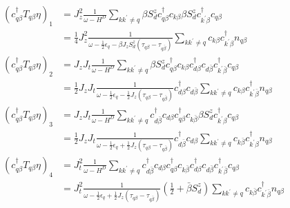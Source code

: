 \documentclass[14pt]{extarticle}
\numberwithin{equation}{section}
\begin{document}
\begin{subequations} \label{eq:31} 
 \begin{align}
\left( c^{\dag}_{q\beta}T_{q\beta}\eta \right)_1  &= J_z^2 \frac{1}{\omega - H^D} \sum\limits_{kk^{\prime}\ne q} \beta S_d^z c^{\dag}_{q\beta}c_{k\beta}  \beta S_d^z c^{\dag}_{k^{\prime}\beta}c_{q\beta} \nonumber\\
                                    &= \frac{1}{4} J_z^2 \frac{1}{\omega - \frac{1}{2} \epsilon_q - \beta J_zS_d^z \left( \tau_{q\beta} - \tau_{q\bar{\beta}} \right)}  \sum\limits_{kk^{\prime}\ne q} c_{k\beta}c^{\dag}_{k^{\prime}\beta} n_{q\beta} \label{eq:32} \\
   \left( c^{\dag}_{q\beta}T_{q\beta}\eta \right)_2  &= J_z J_t\frac{1}{\omega - H^D}  \sum\limits_{kk^{\prime}\ne q} \beta S_d^z c^{\dag}_{q\beta}c_{k\beta} c^{\dag}_{d\beta} c_{d\bar{\beta}} c^{\dag}_{k^{\prime}\bar{\beta}}c_{q\beta} \nonumber\\
                                    &= \frac{1}{2} J_z J_t\frac{1}{\omega - \frac{1}{2}\epsilon_q - \frac{1}{2}J_z \left( \tau_{q\beta} - \tau_{q\bar{\beta}} \right)}  c^{\dag}_{d\beta} c_{d\bar{\beta}} \sum\limits_{kk^{\prime}\ne q}  c_{k\beta} c^{\dag}_{k^{\prime}\bar{\beta}}n_{q\beta}  \label{eq:33} \\
   \left( c^{\dag}_{q\beta}T_{q\beta}\eta \right)_3  &= J_z J_t \frac{1}{\omega - H^D} \sum\limits_{kk^{\prime}\ne q} c^{\dag}_{d\bar{\beta}} c_{d\beta} c^{\dag}_{q\beta}c_{k\bar{\beta}}  \beta S_d^z c^{\dag}_{k^{\prime}\beta}c_{q\beta} \nonumber\\
                                    &= \frac{1}{2} J_z J_t\frac{1}{\omega - \frac{1}{2}\epsilon_q + \frac{1}{2}J_z \left( \tau_{q\beta} - \tau_{q\bar{\beta}} \right)} c^{\dag}_{d\bar{\beta}} c_{d\beta} \sum\limits_{kk^{\prime}\ne q}  c_{k\bar{\beta}}  c^{\dag}_{k^{\prime}\beta} n_{q\beta} \label{eq:34} \\
\left( c^{\dag}_{q\beta}T_{q\beta}\eta \right)_4  &= J_t^2 \frac{1}{\omega - H^D} \sum\limits_{kk^{\prime}\ne q} c^{\dag}_{d\bar{\beta}} c_{d\beta} c^{\dag}_{q\beta}c_{k\bar{\beta}}  c^{\dag}_{d\beta} c_{d\bar{\beta}}  c^{\dag}_{k^{\prime}\bar{\beta}}c_{q\beta} \nonumber\\
&= J_t^2 \frac{1}{\omega - \frac{1}{2}\epsilon_q + \frac{1}{2} J_z \left( \tau_{q\beta} - \tau_{q\bar{\beta}} \right)} \left( \frac{1}{2} + \bar{\beta} S_d^z \right) \sum\limits_{kk^{\prime}\ne q} c_{k\bar{\beta}} c^{\dag}_{k^{\prime}\bar{\beta}}n_{q\beta} \label{eq:35}
\end{align}
\end{subequations}
\end{document}
